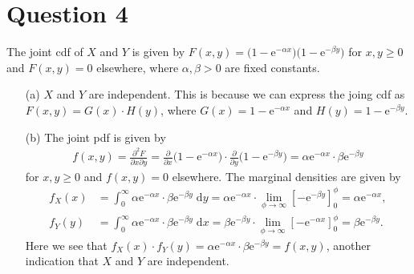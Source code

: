 \documentclass[10pt]{article}
\begin{document}
\section{Question 4} \noindent
The joint cdf of \(X\) and \(Y\) is given by \(F(x,y) = \big( 1 - \mathrm{e}^{-\alpha x} \big) \big( 1 - \mathrm{e}^{-\beta y} \big)\) for \(x,y \ge 0\) and
\(F(x,y) = 0\) elsewhere, where \(\alpha, \beta > 0\) are fixed constants. 
\begin{itemize}
    \item[(a)] \(X\) and \(Y\) are independent. This is because we can express the joing cdf as \(F(x,y) = G(x)\cdot H(y)\), where \(G(x) = 1 - \mathrm{e}^{-\alpha x}\)
    and \(H(y) = 1 - \mathrm{e}^{-\beta y}\). 
    \item[(b)] The joint pdf is given by 
    \begin{align*}
        f(x,y) = \frac{\partial^2 F}{\partial x \partial y} 
        = \frac{\partial}{\partial x}\big( 1 - \mathrm{e}^{-\alpha x} \big) \cdot \frac{\partial}{\partial y}\big( 1 - \mathrm{e}^{-\beta y} \big)
        = \alpha \mathrm{e}^{-\alpha x} \cdot \beta \mathrm{e}^{-\beta y}
    \end{align*}
    for \(x, y \ge 0\) and \(f(x,y) = 0\) elsewhere. The marginal densities are given by 
    \begin{align*}
        f_X(x) 
        &= \int_{0}^{\infty} \alpha \mathrm{e}^{-\alpha x} \cdot \beta \mathrm{e}^{-\beta y} \;\mathrm{d}y
        = \alpha \mathrm{e}^{-\alpha x} \cdot \lim_{\phi \to \infty} \left[- \mathrm{e}^{-\beta y} \right]_0^{\phi}
        = \alpha \mathrm{e}^{-\alpha x}, \\
        f_Y(y) 
        &= \int_{0}^{\infty} \alpha \mathrm{e}^{-\alpha x} \cdot \beta \mathrm{e}^{-\beta y} \;\mathrm{d}x
        = \beta \mathrm{e}^{-\beta y} \cdot \lim_{\phi \to \infty} \left[- \mathrm{e}^{-\alpha x} \right]_0^{\phi}
        = \beta \mathrm{e}^{-\beta y}.
    \end{align*}
    Here we see that \(f_X(x)\cdot f_Y(y) = \alpha \mathrm{e}^{-\alpha x} \cdot \beta \mathrm{e}^{-\beta y} = f(x,y)\), another indication 
    that \(X\) and \(Y\) are independent. 
\end{itemize}
\end{document}
